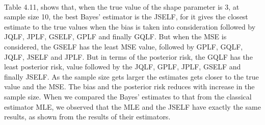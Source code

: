 \documentclass[a4paper,12pt]{report}
\begin{document}
{\begin{minipage}{\linewidth}
		
\end{minipage}
\\\vspace{1cm}

\indent Table 4.11, shows that, when the true value of the shape parameter is 3, at sample size 10, the best Bayes’ estimator is the JSELF, for it gives the closest estimate to the true values when the bias is taken into consideration followed by JQLF, JPLF, GSELF, GPLF and finally GQLF. But when the MSE is considered, the GSELF has the least MSE value, followed by GPLF, GQLF, JQLF, JSELF and JPLF. But in terms of the posterior risk, the GQLF has the least posterior risk, value followed by the JQLF, GPLF, JPLF, GSELF and finally JSELF.
As the sample size gets larger the estimates gets closer to the true value and the MSE. The bias and the posterior risk reduces with increase in the sample size. When we compared the Bayes’ estimates to that from the classical estimator MLE, we observed that the MLE and the JSELF have exactly the same results, as shown from the results of their estimators.\\


}
\end{document}
